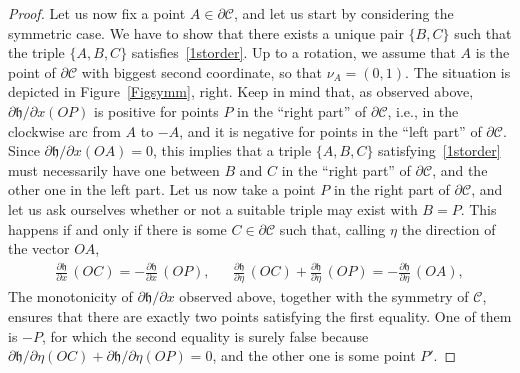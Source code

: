 \documentclass[11pt]{article}
\newcommand{\ie}{i.e.,\xspace}
\numberwithin{equation}{section}
\newcommand\C{\mathcal{C}}
\newcommand\h{\mathfrak h}
\theoremstyle{plain}
\theoremstyle{definition}
\begin{document}
\begin{proof}
Let us now fix a point $A\in \partial\C$, and let us start by considering the symmetric case. We have to show that there exists a unique pair $\{B,C\}$ such that the triple $\{A,B,C\}$ satisfies~\eqref{1storder}. Up to a rotation, we assume that $A$ is the point of $\partial\C$ with biggest second coordinate, so that $\nu_A=(0,1)$. The situation is depicted in Figure~\ref{Figsymm}, right. Keep in mind that, as observed above, $\partial\h/\partial x(OP)$ is positive for points $P$ in the ``right part'' of $\partial\C$, \ie in the clockwise arc from $A$ to $-A$, and it is negative for points in the ``left part'' of $\partial \C$. Since $\partial \h/\partial x(OA)=0$, this implies that a triple $\{A,B,C\}$ satisfying~\eqref{1storder} must necessarily have one between $B$ and $C$ in the ``right part'' of $\partial\C$, and the other one in the left part. Let us now take a point $P$ in the right part of $\partial\C$, and let us ask ourselves whether or not a suitable triple may exist with $B=P$. This happens if and only if there is some $C\in\partial\C$ such that, calling $\eta$ the direction of the vector $OA$,
\begin{align}\label{devsod}
\frac{\partial\h}{\partial x}\, (OC) = -\frac{\partial\h}{\partial x}\, (OP), && \frac{\partial\h}{\partial \eta}\, (OC) +\frac{\partial\h}{\partial \eta}\, (OP) = -\frac{\partial\h}{\partial \eta}\, (OA),
\end{align}
The monotonicity of $\partial\h/\partial x$ observed above, together with the symmetry of $\C$, ensures that there are exactly two points satisfying the first equality. One of them is $-P$, for which the second equality is surely false because $\partial \h/\partial\eta(OC) +\partial \h/\partial\eta(OP)=0$, and the other one is some point $P'$.


\end{proof}
\end{document}
